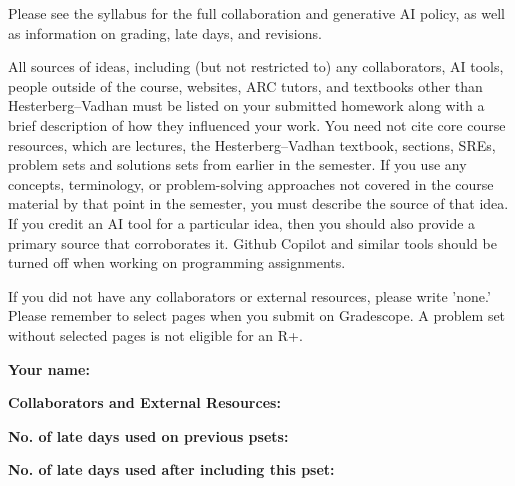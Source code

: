 \documentclass[11pt]{article}
\begin{document}

Please see the syllabus for the full collaboration and generative AI policy, as well as information on grading, late days, and revisions.

All sources of ideas, including (but not restricted to) any collaborators, AI tools, people outside of the course, websites, ARC tutors, and textbooks other than Hesterberg--Vadhan must be listed on your submitted homework along with a brief description of how they influenced your work. You need not cite core course resources, which are lectures, the Hesterberg--Vadhan textbook, sections, SREs, problem sets and solutions sets from earlier in the semester. If you use any concepts, terminology, or problem-solving approaches not covered in the course material by that point in the semester, you must describe the source of that idea. If you credit an AI tool for a particular idea, then you should also provide a primary source that corroborates it. Github Copilot and similar tools should be turned off when working on programming assignments.

If you did not have any collaborators or external resources, please write 'none.' Please remember to select pages when you submit on Gradescope. A problem set without selected pages is not eligible for an R+. 
\newline

\textbf{Your name: }

\textbf{Collaborators and External Resources:}

\textbf{No. of late days used on previous psets: }

\textbf{No. of late days used after including this pset: }

\vspace{1em}

\newpage
\end{document}
